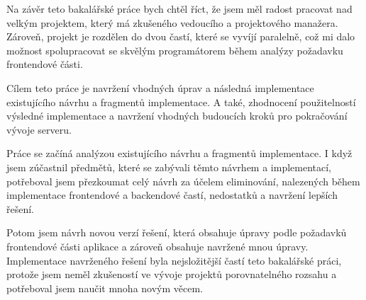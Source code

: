 


Na závěr teto bakalářské práce bych chtěl říct, že jsem měl radost pracovat nad velkým projektem, který má zkušeného vedoucího a projektového manažera. Zároveň, projekt je rozdělen do dvou častí, které se vyvíjí paralelně, což mi dalo možnost spolupracovat se skvělým programátorem během analýzy požadavku frontendové části.

Cílem teto práce je navržení vhodných úprav a následná implementace existujícího návrhu a fragmentů implementace. A také, zhodnocení použitelností výsledné implementace a navržení vhodných budoucích kroků pro pokračování vývoje serveru.

Práce se začíná analýzou existujícího návrhu a fragmentů implementace. I když jsem zúčastnil předmětů, které se zabývali těmto návrhem a implementací, potřeboval jsem přezkoumat celý návrh za účelem eliminování, nalezených během implementace frontendové a backendové častí, nedostatků a navržení lepších řešení.

 Potom jsem návrh novou verzí řešení, která obsahuje úpravy podle požadavků frontendové části aplikace a zároveň obsahuje navržené mnou úpravy. Implementace navrženého řešení byla nejsložitější častí teto bakalářské práci, protože jsem neměl zkušeností ve vývoje projektů porovnatelného rozsahu a potřeboval jsem naučit mnoha novým věcem.
 
